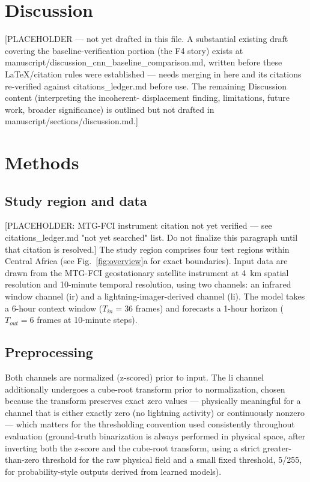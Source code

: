 \documentclass[pdflatex,sn-nature]{sn-jnl}%
\begin{document}
\section{Discussion}\label{sec:discussion}

[PLACEHOLDER --- not yet drafted in this file. A substantial existing
draft covering the baseline-verification portion (the F4 story) exists
at manuscript/discussion\_cnn\_baseline\_comparison.md, written before
these LaTeX/citation rules were established --- needs merging in here
and its citations re-verified against citations\_ledger.md before use.
The remaining Discussion content (interpreting the incoherent-
displacement finding, limitations, future work, broader significance)
is outlined but not drafted in manuscript/sections/discussion.md.]

\section{Methods}\label{sec:methods}

\subsection*{Study region and data}

[PLACEHOLDER: MTG-FCI instrument citation not yet verified --- see
citations\_ledger.md "not yet searched" list. Do not finalize this
paragraph until that citation is resolved.] The study region comprises
four test regions within Central Africa (see Fig.~\ref{fig:overview}a
for exact boundaries). Input data are drawn from the MTG-FCI
geostationary satellite instrument at 4~km spatial resolution and
10-minute temporal resolution, using two channels: an infrared window
channel (ir) and a lightning-imager-derived channel (li). The model
takes a 6-hour context window ($T_{in} = 36$ frames) and forecasts a
1-hour horizon ($T_{out} = 6$ frames at 10-minute steps).

\subsection*{Preprocessing}

Both channels are normalized (z-scored) prior to input. The li channel
additionally undergoes a cube-root transform prior to normalization,
chosen because the transform preserves exact zero values --- physically
meaningful for a channel that is either exactly zero (no lightning
activity) or continuously nonzero --- which matters for the
thresholding convention used consistently throughout evaluation
(ground-truth binarization is always performed in physical space, after
inverting both the z-score and the cube-root transform, using a strict
greater-than-zero threshold for the raw physical field and a small
fixed threshold, 5/255, for probability-style outputs derived from
learned models).
\end{document}
